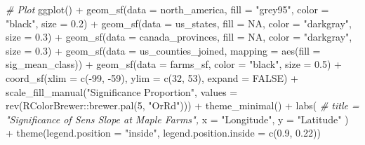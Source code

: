 \documentclass[
]{article}
\newenvironment{Shaded}{}{}
\newcommand{\AttributeTok}[1]{\textcolor[rgb]{0.49,0.56,0.16}{#1}}
\newcommand{\CommentTok}[1]{\textcolor[rgb]{0.38,0.63,0.69}{\textit{#1}}}
\newcommand{\ConstantTok}[1]{\textcolor[rgb]{0.53,0.00,0.00}{#1}}
\newcommand{\DecValTok}[1]{\textcolor[rgb]{0.25,0.63,0.44}{#1}}
\newcommand{\FloatTok}[1]{\textcolor[rgb]{0.25,0.63,0.44}{#1}}
\newcommand{\FunctionTok}[1]{\textcolor[rgb]{0.02,0.16,0.49}{#1}}
\newcommand{\NormalTok}[1]{#1}
\newcommand{\SpecialCharTok}[1]{\textcolor[rgb]{0.25,0.44,0.63}{#1}}
\newcommand{\StringTok}[1]{\textcolor[rgb]{0.25,0.44,0.63}{#1}}
\begin{document}
\begin{Shaded}
\begin{Highlighting}[]
\CommentTok{\# Plot}
\FunctionTok{ggplot}\NormalTok{() }\SpecialCharTok{+}
  \FunctionTok{geom\_sf}\NormalTok{(}\AttributeTok{data =}\NormalTok{ north\_america, }\AttributeTok{fill =} \StringTok{"grey95"}\NormalTok{, }\AttributeTok{color =} \StringTok{"black"}\NormalTok{, }\AttributeTok{size =} \FloatTok{0.2}\NormalTok{) }\SpecialCharTok{+}
  \FunctionTok{geom\_sf}\NormalTok{(}\AttributeTok{data =}\NormalTok{ us\_states, }\AttributeTok{fill =} \ConstantTok{NA}\NormalTok{, }\AttributeTok{color =} \StringTok{"darkgray"}\NormalTok{, }\AttributeTok{size =} \FloatTok{0.3}\NormalTok{) }\SpecialCharTok{+}
  \FunctionTok{geom\_sf}\NormalTok{(}\AttributeTok{data =}\NormalTok{ canada\_provinces, }\AttributeTok{fill =} \ConstantTok{NA}\NormalTok{, }\AttributeTok{color =} \StringTok{"darkgray"}\NormalTok{, }\AttributeTok{size =} \FloatTok{0.3}\NormalTok{) }\SpecialCharTok{+}
  \FunctionTok{geom\_sf}\NormalTok{(}\AttributeTok{data =}\NormalTok{ us\_counties\_joined, }\AttributeTok{mapping =} \FunctionTok{aes}\NormalTok{(}\AttributeTok{fill =}\NormalTok{ sig\_mean\_class)) }\SpecialCharTok{+}
  \FunctionTok{geom\_sf}\NormalTok{(}\AttributeTok{data =}\NormalTok{ farms\_sf, }\AttributeTok{color =} \StringTok{"black"}\NormalTok{, }\AttributeTok{size =} \FloatTok{0.5}\NormalTok{) }\SpecialCharTok{+}
  \FunctionTok{coord\_sf}\NormalTok{(}\AttributeTok{xlim =} \FunctionTok{c}\NormalTok{(}\SpecialCharTok{{-}}\DecValTok{99}\NormalTok{, }\SpecialCharTok{{-}}\DecValTok{59}\NormalTok{), }\AttributeTok{ylim =} \FunctionTok{c}\NormalTok{(}\DecValTok{32}\NormalTok{, }\DecValTok{53}\NormalTok{), }\AttributeTok{expand =} \ConstantTok{FALSE}\NormalTok{) }\SpecialCharTok{+}
  \FunctionTok{scale\_fill\_manual}\NormalTok{(}\StringTok{"Significance Proportion"}\NormalTok{, }
                    \AttributeTok{values =} \FunctionTok{rev}\NormalTok{(RColorBrewer}\SpecialCharTok{::}\FunctionTok{brewer.pal}\NormalTok{(}\DecValTok{5}\NormalTok{, }\StringTok{"OrRd"}\NormalTok{))) }\SpecialCharTok{+}
  \FunctionTok{theme\_minimal}\NormalTok{() }\SpecialCharTok{+}
  \FunctionTok{labs}\NormalTok{(}
    \CommentTok{\# title = "Significance of Sens Slope at Maple Farms",}
    \AttributeTok{x =} \StringTok{"Longitude"}\NormalTok{,}
    \AttributeTok{y =} \StringTok{"Latitude"}
\NormalTok{  ) }\SpecialCharTok{+}
  \FunctionTok{theme}\NormalTok{(}\AttributeTok{legend.position =} \StringTok{"inside"}\NormalTok{,}
        \AttributeTok{legend.position.inside =} \FunctionTok{c}\NormalTok{(}\FloatTok{0.9}\NormalTok{, }\FloatTok{0.22}\NormalTok{))}
\end{Highlighting}
\end{Shaded}
\end{document}
